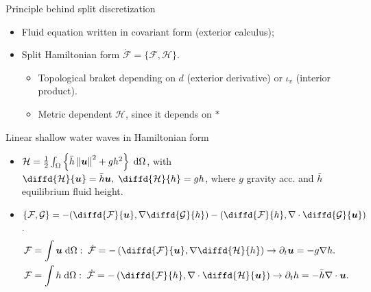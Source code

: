 \documentclass{beamer}
\newcommand*{\norm}[1]{\ensuremath{\left\|#1\right\|}}
\newcommand{\energy}[1]{\frac{1}{2} \int_{\Omega} \left\{ #1 \right\} \d\Omega}
\begin{document}
\begin{frame}[fragile]{Principle behind split discretization}
\begin{itemize}
	\item Fluid equation written in covariant form (exterior calculus);
	\item Split Hamiltonian form $\dot{\mathcal{F}}= \{\mathcal{F}, \mathcal{H}\}$.	
	\begin{itemize}
		\item Topological braket depending on $d$ (exterior derivative) or $\iota_v$ (interior product).
		\item Metric dependent $\mathcal{H}$, since it depends on $*$
	\end{itemize}
\end{itemize}	
\begin{block}{Linear shallow water waves in Hamiltonian form}
	\begin{itemize}
		\item $\mathcal{H} = \energy{\bar{h} \norm{\bm{u}}^2 + g h^2}$, with $\diffd{\mathcal{H}}{\bm{u}} = \bar{h}\bm{u}, \; \diffd{\mathcal{H}}{h}=g h$, where $g$ gravity acc. and $\bar{h}$ equilibrium fluid height.
		\item $\{\mathcal{F}, \mathcal{G}\} = -(\diffd{\mathcal{F}}{\bm{u}}, \nabla \diffd{\mathcal{G}}{h}) - (\diffd{\mathcal{F}}{h}, \nabla \cdot \diffd{\mathcal{G}}{\bm{u}})$.
		\begin{equation*}
			\begin{aligned}
				\mathcal{F} &= \int \bm{u} \d{\Omega}: \; \dot{\mathcal{F}} = - \left(\diffd{\mathcal{F}}{\bm{u}}, \nabla \diffd{\mathcal{H}}{h}\right) \rightarrow \partial_t \bm{u} = -g \nabla h. \\
				\mathcal{F} &= \int h \d{\Omega}: \;\dot{\mathcal{F}} = - \left(\diffd{\mathcal{F}}{h}, \nabla \cdot \diffd{\mathcal{H}}{\bm{u}}\right) \rightarrow \partial_t h = -\bar{h} \nabla \cdot \bm{u}.
			\end{aligned}
		\end{equation*}
		
	\end{itemize}
\end{block}

\end{frame}
\end{document}
